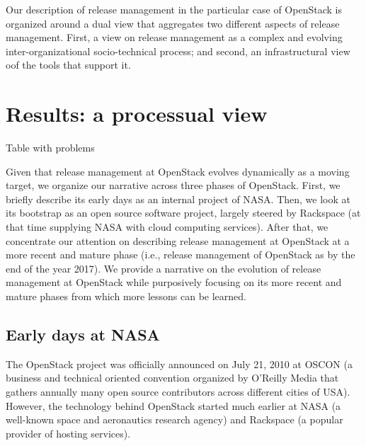 \documentclass[dvipsnames]{interact}
\theoremstyle{plain}\newtheorem{theorem}{Theorem}[section]
\theoremstyle{definition}
\theoremstyle{remark}
\newcommand{\newPara}[1]{\textcolor{Sepia}{#1}}
\renewcommand{\newPara}[1]{#1}
\begin{document}
Our description of release management in the particular case of OpenStack is organized around a dual view that aggregates two different aspects of release management. First, a view on release management as a complex and evolving inter-organizational socio-technical process; and second, an infrastructural view oof the tools that support it. 

\section{Results: a processual view}
\label{sc:process}


Table with problems 

\newPara{
Given that release management at OpenStack evolves dynamically as a moving target, we organize our narrative across three phases of OpenStack. First, we briefly describe its early days as an internal project of NASA. Then, we look at its bootstrap as an open source software project, largely steered by Rackspace (at that time supplying NASA with cloud computing services). After that, we concentrate our attention on describing release management at OpenStack at a more recent and mature phase (i.e., release management of OpenStack as by the end of the year 2017).  We provide a narrative on the evolution of release management at OpenStack while purposively focusing on its more recent and mature phases from which more lessons can be learned. 
}
\subsection{Early days at NASA}
The OpenStack project was officially announced on July 21, 2010 at OSCON (a business and technical oriented convention organized by O'Reilly Media that gathers annually many open source contributors across different cities of USA). However, the technology behind OpenStack started much earlier at NASA  (a well-known space and aeronautics research agency) and Rackspace (a popular provider of hosting services).
\end{document}
